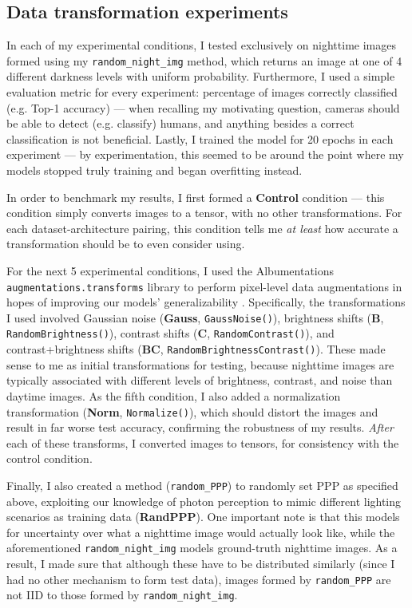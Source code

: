 \documentclass{article}
\begin{document}
\subsection{Data transformation experiments}
\label{subsection:simpleTransforms}
In each of my experimental conditions, I tested exclusively on nighttime images formed using my \texttt{random\_night\_img} method, which returns an image at one of 4 different darkness levels with uniform probability. Furthermore, I used a simple evaluation metric for every experiment: percentage of images correctly classified (e.g. Top-1 accuracy) --- when recalling my motivating question, cameras should be able to detect (e.g. classify) humans, and anything besides a correct classification is not beneficial. Lastly, I trained the model for 20 epochs in each experiment --- by experimentation, this seemed to be around the point where my models stopped truly training and began overfitting instead.

In order to benchmark my results, I first formed a \textbf{Control} condition --- this condition simply converts images to a tensor, with no other transformations. For each dataset-architecture pairing, this condition tells me \textit{at least} how accurate a transformation should be to even consider using.


For the next 5 experimental conditions, I used the Albumentations \texttt{augmentations.transforms} library to perform pixel-level data augmentations in hopes of improving our models' generalizability \cite{albumentations}. Specifically, the transformations I used involved Gaussian noise (\textbf{Gauss}, \texttt{GaussNoise()}), brightness shifts (\textbf{B}, \texttt{RandomBrightness()}), contrast shifts (\textbf{C}, \texttt{RandomContrast()}), and contrast+brightness shifts (\textbf{BC}, \texttt{RandomBrightnessContrast()}). These made sense to me as initial transformations for testing, because nighttime images are typically associated with different levels of brightness, contrast, and noise than daytime images. As the fifth condition, I also added a normalization transformation (\textbf{Norm}, \texttt{Normalize()}), which should distort the images and result in far worse test accuracy, confirming the robustness of my results. \textit{After} each of these transforms, I converted images to tensors, for consistency with the control condition.

Finally, I also created a method (\texttt{random\_PPP}) to randomly set PPP as specified above, exploiting our knowledge of photon perception to mimic different lighting scenarios as training data (\textbf{RandPPP}). One important note is that this models for uncertainty over what a nighttime image would actually look like, while the aforementioned \texttt{random\_night\_img} models ground-truth nighttime images. As a result, I made sure that although these have to be distributed similarly (since I had no other mechanism to form test data), images formed by \texttt{random\_PPP} are not IID to those formed by \texttt{random\_night\_img}. 
\end{document}
